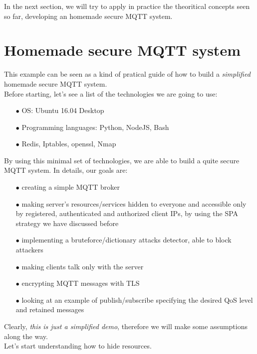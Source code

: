 \documentclass[12pt]{report}
\begin{document}
{{In the next section, we will try to apply in practice the theoritical concepts seen so far, developing an homemade secure MQTT system.\\

\section{Homemade secure MQTT system}
\bigskip
This example can be seen as a kind of pratical guide of how to build a \emph{simplified} homemade secure MQTT system.\\
Before starting, let's see a list of the technologies we are going to use:
\bigskip
\begin{itemize}
\setlength{\itemindent}{+4mm}
\item[$\bullet$] OS: Ubuntu 16.04 Desktop
\item[$\bullet$] Programming languages: Python, NodeJS, Bash
\item[$\bullet$] Redis, Iptables, openssl, Nmap\\
\end{itemize}

By using this minimal set of technologies, we are able to build a quite secure MQTT system. In details, our goals are:\bigskip
\begin{itemize}
\setlength{\itemindent}{+4mm}
\item[$\bullet$] creating a simple MQTT broker
\item[$\bullet$] making server's resources/services hidden to everyone and accessible only by registered, authenticated and authorized client IPs, by using the SPA strategy we have discussed before
\item[$\bullet$] implementing a bruteforce/dictionary attacks detector, able to block attackers
\item[$\bullet$] making clients talk only with the server
\item[$\bullet$] encrypting MQTT messages with TLS
\item[$\bullet$] looking at an example of publish/subscribe specifying the desired QoS level and retained messages\\
\end{itemize}

Clearly, \emph{this is just a simplified demo}, therefore we will make some assumptions along the way.\\

Let's start understanding how to hide resources.

}}
\end{document}
